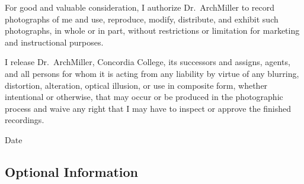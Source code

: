 \documentclass{tufte-handout}
\begin{document}
For good and valuable consideration, I authorize Dr.~ArchMiller to record photographs of me and use, reproduce, modify, distribute, and exhibit such photographs, in whole or in part, without restrictions or limitation for marketing and instructional purposes. 

I release Dr.~ArchMiller, Concordia College, its successors and assigns, agents, and all persons for whom it is acting from any liability by virtue of any blurring, distortion, alteration, optical illusion, or use in composite form, whether intentional or otherwise, that may occur or be produced in the photographic process and waive any right that I may have to inspect or approve the finished recordings.

  \hrulefill
{}  \underline{\hspace{5cm}} {Date}  \hrulefill

\subsection{Optional Information}

 \hrulefill

 \hrulefill

 \hrulefill

 \hrulefill


 \hrulefill

\hrulefill

 \hrulefill

 \hrulefill

\hrulefill

\hrulefill

\hrulefill
\end{document}
